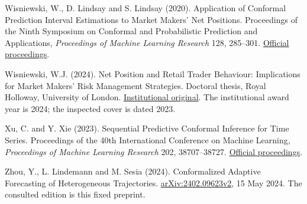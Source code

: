 \documentclass[10pt,a4paper]{article}
\begin{document}
Wisniewski, W., D. Lindsay and S. Lindsay (2020). Application of Conformal Prediction Interval Estimations to Market Makers' Net Positions. Proceedings of the Ninth Symposium on Conformal and Probabilistic Prediction and Applications, \emph{Proceedings of Machine Learning Research} 128, 285–301. \href{https://proceedings.mlr.press/v128/wisniewski20a.html}{Official proceedings}.

Wisniewski, W.J. (2024). Net Position and Retail Trader Behaviour: Implications for Market Makers' Risk Management Strategies. Doctoral thesis, Royal Holloway, University of London. \href{https://pure.royalholloway.ac.uk/ws/portalfiles/portal/63018039/2024WisniewskiWJWphd.pdf}{Institutional original}. The institutional award year is 2024; the inspected cover is dated 2023.

Xu, C. and Y. Xie (2023). Sequential Predictive Conformal Inference for Time Series. Proceedings of the 40th International Conference on Machine Learning, \emph{Proceedings of Machine Learning Research} 202, 38707–38727. \href{https://proceedings.mlr.press/v202/xu23r.html}{Official proceedings}.

Zhou, Y., L. Lindemann and M. Sesia (2024). Conformalized Adaptive Forecasting of Heterogeneous Trajectories. \href{https://arxiv.org/abs/2402.09623v2}{arXiv:2402.09623v2}, 15 May 2024. The consulted edition is this fixed preprint.
\end{document}
